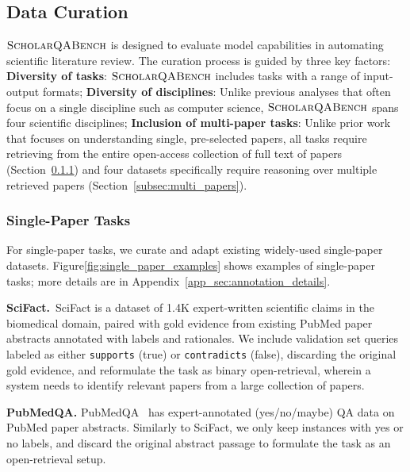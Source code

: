 \documentclass{article} %
\newcommand{\data}{$\textsc{ScholarQABench}$\xspace}
\renewcommand{\paragraph}[1]{\noindent \textbf{#1}}
\newcommand{\Sref}[1]{Section~\ref{#1}}
\begin{document}
\subsection{Data Curation}
\label{subsec:data_curation}
\data is designed to evaluate model capabilities in automating scientific literature review. The curation process is guided by three key factors: 
{\bf Diversity of tasks}: \data includes tasks with a range of input-output formats; 
{\bf Diversity of disciplines}: Unlike previous analyses that often focus on a single discipline such as computer science, 
\data spans four scientific disciplines; 
{\bf Inclusion of multi-paper tasks}: Unlike prior work that focuses on understanding single, pre-selected papers, all tasks require retrieving from the entire open-access collection of full text of papers (\Sref{subsec:single_paper_task}) 
 and four datasets specifically require reasoning over multiple retrieved papers (\Sref{subsec:multi_papers}). 


\subsubsection{Single-Paper Tasks}
\label{subsec:single_paper_task}
For single-paper tasks, we curate and adapt existing widely-used single-paper datasets. Figure\ref{fig:single_paper_examples} shows examples of single-paper tasks; more details are in Appendix~\ref{app_sec:annotation_details}. 

\paragraph{SciFact.}~SciFact \citep{wadden-etal-2020-fact} is a dataset of 1.4K expert-written scientific claims in the biomedical domain, paired with gold evidence from existing PubMed paper abstracts annotated with labels and rationales. 
We include validation set queries labeled as either \texttt{supports} (true) or \texttt{contradicts} (false), discarding the original gold evidence, and reformulate the task as binary open-retrieval, wherein a system needs to identify relevant papers from a large collection of papers.  

\paragraph{PubMedQA.}
{PubMedQA}~\citep{jin-etal-2019-pubmedqa} has expert-annotated (yes/no/maybe) QA data on PubMed paper abstracts. 
Similarly to {SciFact}, we only keep instances with yes or no labels, and discard the original abstract passage to formulate the task as an open-retrieval setup. 
\end{document}
